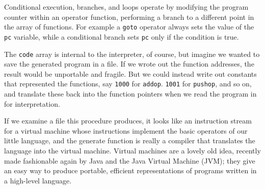 Conditional execution, branches, and loops operate by modifying the program
counter within an operator function, performing a branch to a different
point in the array of functions. For example a \verb'goto' operator always
sets the value of the \verb'pc' variable, while a conditional branch sets
\verb'pc' only if the condition is true.

The \verb'code' array is internal to the interpreter, of course, but
imagine we wanted to save the generated program in a file. If we wrote out
the function addresses, the result would be unportable and fragile. But we
could instead write out constants that represented the functions, say
\verb'1000' for \verb'addop'.  \verb'1001' for \verb'pushop', and so on,
and translate these back into the function pointers when we read the
program in for interpretation.

If we examine a file this procedure produces, it looks like an instruction
stream for a virtual machine whose instructions implement the basic
operators of our little language, and the generate function is really a
compiler that translates the language into the virtual machine. Virtual
machines are a lovely old idea, recently made fashionable again by Java and
the Java Virtual Machine (JVM); they give an easy way to produce portable,
efficient representations of programs written in a high-level language.
